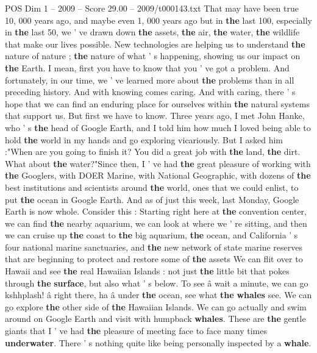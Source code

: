 \begin{textsample}{POS Dim 1 – 2009 – Score 29.00 – 2009/t000143.txt}
That may have been true 10, 000 years ago, and maybe even 1, 000 years ago but in \textbf{the} last 100, especially in \textbf{the} last 50, we ' ve drawn down \textbf{the} assets, \textbf{the} air, \textbf{the} water, \textbf{the} wildlife that make our lives possible.
New technologies are helping us to understand \textbf{the} nature of nature ; \textbf{the} nature of what ' s happening, showing us our impact on \textbf{the} Earth.
I mean, first you have to know that you ' ve got a problem.
And fortunately, in our time, we ' ve learned more about \textbf{the} problems than in all preceding history.
And with knowing comes caring.
And with caring, there ' s hope that we can find an enduring place for ourselves within \textbf{the} natural systems that support us.
But first we have to know.
Three years ago, I met John Hanke, who ' s \textbf{the} head of Google Earth, and I told him how much I loved being able to hold \textbf{the} world in my hands and go exploring vicariously.
But I asked him :"When are you going to finish it?
You did a great job with \textbf{the} land, \textbf{the} dirt.
What about \textbf{the} water?"Since then, I ' ve had \textbf{the} great pleasure of working with \textbf{the} Googlers, with DOER Marine, with National Geographic, with dozens of \textbf{the} best institutions and scientists around \textbf{the} world, ones that we could enlist, to put \textbf{the} ocean in Google Earth.
And as of just this week, last Monday, Google Earth is now whole.
Consider this : Starting right here at \textbf{the} convention center, we can find \textbf{the} nearby aquarium, we can look at where we ' re sitting, and then we can cruise up \textbf{the} coast to \textbf{the} big aquarium, \textbf{the} ocean, and California ' s four national marine sanctuaries, and \textbf{the} new network of state marine reserves that are beginning to protect and restore some of \textbf{the} assets We can flit over to Hawaii and see \textbf{the} real Hawaiian Islands : not just \textbf{the} little bit that pokes through \textbf{the} \textbf{surface}, but also what ' s below.
To see â wait a minute, we can go kshhplash! â right there, ha â under \textbf{the} ocean, see what \textbf{the} \textbf{whales} see.
We can go explore \textbf{the} other side of \textbf{the} Hawaiian Islands.
We can go actually and swim around on Google Earth and visit with humpback \textbf{whales}.
These are \textbf{the} gentle giants that I ' ve had \textbf{the} pleasure of meeting face to face many times \textbf{underwater}.
There ' s nothing quite like being personally inspected by a \textbf{whale}.

\end{textsample}
